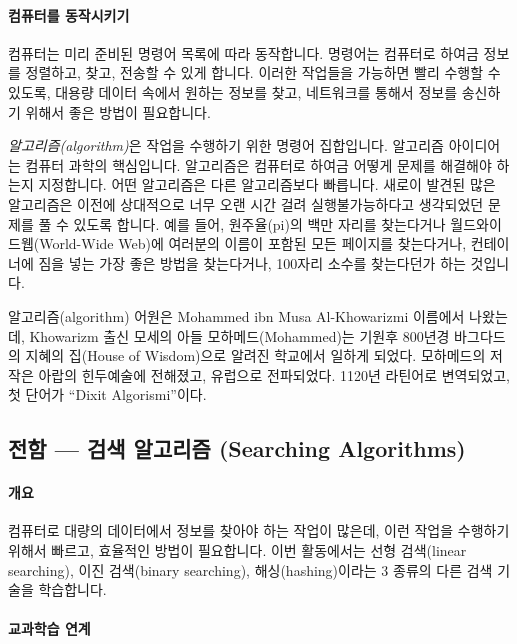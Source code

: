 \documentclass[]{article}
\begin{document}
\mbox{}\paragraph{컴퓨터를 동작시키기}\label{section-86}

컴퓨터는 미리 준비된 명령어 목록에 따라 동작합니다. 명령어는 컴퓨터로
하여금 정보를 정렬하고, 찾고, 전송할 수 있게 합니다. 이러한 작업들을
가능하면 빨리 수행할 수 있도록, 대용량 데이터 속에서 원하는 정보를 찾고,
네트워크를 통해서 정보를 송신하기 위해서 좋은 방법이 필요합니다.

\emph{알고리즘(algorithm)}은 작업을 수행하기 위한 명령어 집합입니다.
알고리즘 아이디어는 컴퓨터 과학의 핵심입니다. 알고리즘은 컴퓨터로 하여금
어떻게 문제를 해결해야 하는지 지정합니다. 어떤 알고리즘은 다른
알고리즘보다 빠릅니다. 새로이 발견된 많은 알고리즘은 이전에 상대적으로
너무 오랜 시간 걸려 실행불가능하다고 생각되었던 문제를 풀 수 있도록
합니다. 예를 들어, 원주율(pi)의 백만 자리를 찾는다거나
월드와이드웹(World-Wide Web)에 여러분의 이름이 포함된 모든 페이지를
찾는다거나, 컨테이너에 짐을 넣는 가장 좋은 방법을 찾는다거나, 100자리
소수를 찾는다던가 하는 것입니다.

알고리즘(algorithm) 어원은 Mohammed ibn Musa Al-Khowarizmi 이름에서
나왔는데, Khowarizm 출신 모세의 아들 모하메드(Mohammed)는 기원후 800년경
바그다드의 지혜의 집(House of Wisdom)으로 알려진 학교에서 일하게 되었다.
모하메드의 저작은 아랍의 힌두예술에 전해졌고, 유럽으로 전파되었다.
1120년 라틴어로 변역되었고, 첫 단어가 ``Dixit Algorismi''이다.

\subsection{전함 --- 검색 알고리즘 (Searching
Algorithms)}\label{mdash---searching-algorithms}

\mbox{}\paragraph{개요}\label{section-87}

컴퓨터로 대량의 데이터에서 정보를 찾아야 하는 작업이 많은데, 이런 작업을
수행하기 위해서 빠르고, 효율적인 방법이 필요합니다. 이번 활동에서는 선형
검색(linear searching), 이진 검색(binary searching), 해싱(hashing)이라는
3 종류의 다른 검색 기술을 학습합니다.

\mbox{}\paragraph{교과학습 연계}\label{section-88}
\end{document}
